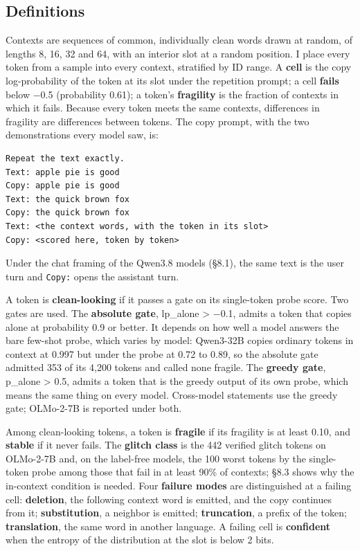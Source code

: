 \documentclass[11pt]{article}
\begin{document}
\subsection{Definitions}\label{definitions}

Contexts are sequences of common, individually clean words drawn at random, of lengths 8, 16, 32 and 64, with an interior slot at a random position. I place every token from a sample into every context, stratified by ID range. A \textbf{cell} is the copy log-probability of the token at its slot under the repetition prompt; a cell \textbf{fails} below \ensuremath{-}0.5 (probability 0.61); a token's \textbf{fragility} is the fraction of contexts in which it fails. Because every token meets the same contexts, differences in fragility are differences between tokens. The copy prompt, with the two demonstrations every model saw, is:

\begin{Verbatim}[breaklines=true,breakanywhere=true,fontsize=\small]
Repeat the text exactly.
Text: apple pie is good
Copy: apple pie is good
Text: the quick brown fox
Copy: the quick brown fox
Text: <the context words, with the token in its slot>
Copy: <scored here, token by token>
\end{Verbatim}

Under the chat framing of the Qwen3.8 models (§8.1), the same text is the user turn and \texttt{Copy:} opens the assistant turn.

A token is \textbf{clean-looking} if it passes a gate on its single-token probe score. Two gates are used. The \textbf{absolute gate}, lp\_alone \textgreater{} \ensuremath{-}0.1, admits a token that copies alone at probability 0.9 or better. It depends on how well a model answers the bare few-shot probe, which varies by model: Qwen3-32B copies ordinary tokens in context at 0.997 but under the probe at 0.72 to 0.89, so the absolute gate admitted 353 of its 4,200 tokens and called none fragile. The \textbf{greedy gate}, p\_alone \textgreater{} 0.5, admits a token that is the greedy output of its own probe, which means the same thing on every model. Cross-model statements use the greedy gate; OLMo-2-7B is reported under both.

Among clean-looking tokens, a token is \textbf{fragile} if its fragility is at least 0.10, and \textbf{stable} if it never fails. The \textbf{glitch class} is the 442 verified glitch tokens on OLMo-2-7B and, on the label-free models, the 100 worst tokens by the single-token probe among those that fail in at least 90\% of contexts; §8.3 shows why the in-context condition is needed. Four \textbf{failure modes} are distinguished at a failing cell: \textbf{deletion}, the following context word is emitted, and the copy continues from it; \textbf{substitution}, a neighbor is emitted; \textbf{truncation}, a prefix of the token; \textbf{translation}, the same word in another language. A failing cell is \textbf{confident} when the entropy of the distribution at the slot is below 2 bits.
\end{document}
